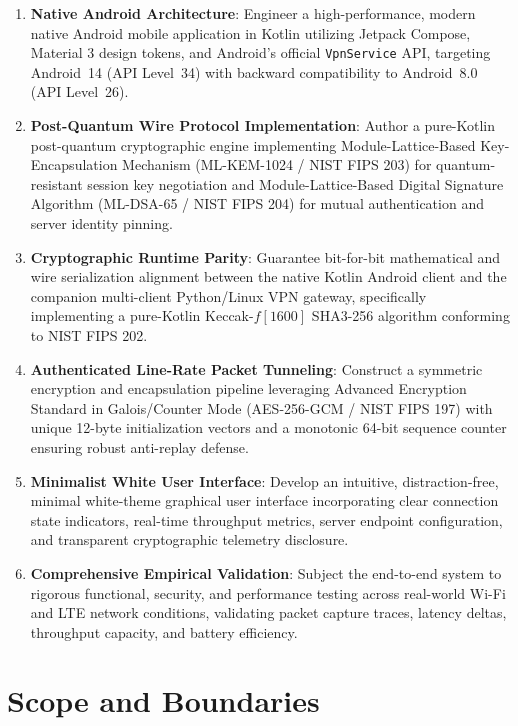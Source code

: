 \begin{enumerate}[label=\textbf{OBJ\arabic*.}]
    \item \textbf{Native Android Architecture}: Engineer a high-performance, modern native Android mobile application in Kotlin utilizing Jetpack Compose, Material 3 design tokens, and Android's official \texttt{VpnService} API, targeting Android~14 (API Level~34) with backward compatibility to Android~8.0 (API Level~26).
    \item \textbf{Post-Quantum Wire Protocol Implementation}: Author a pure-Kotlin post-quantum cryptographic engine implementing Module-Lattice-Based Key-Encapsulation Mechanism (ML-KEM-1024 / NIST FIPS 203) for quantum-resistant session key negotiation and Module-Lattice-Based Digital Signature Algorithm (ML-DSA-65 / NIST FIPS 204) for mutual authentication and server identity pinning.
    \item \textbf{Cryptographic Runtime Parity}: Guarantee bit-for-bit mathematical and wire serialization alignment between the native Kotlin Android client and the companion multi-client Python/Linux VPN gateway, specifically implementing a pure-Kotlin Keccak-$f[1600]$ SHA3-256 algorithm conforming to NIST FIPS 202.
    \item \textbf{Authenticated Line-Rate Packet Tunneling}: Construct a symmetric encryption and encapsulation pipeline leveraging Advanced Encryption Standard in Galois/Counter Mode (AES-256-GCM / NIST FIPS 197) with unique 12-byte initialization vectors and a monotonic 64-bit sequence counter ensuring robust anti-replay defense.
    \item \textbf{Minimalist White User Interface}: Develop an intuitive, distraction-free, minimal white-theme graphical user interface incorporating clear connection state indicators, real-time throughput metrics, server endpoint configuration, and transparent cryptographic telemetry disclosure.
    \item \textbf{Comprehensive Empirical Validation}: Subject the end-to-end system to rigorous functional, security, and performance testing across real-world Wi-Fi and LTE network conditions, validating packet capture traces, latency deltas, throughput capacity, and battery efficiency.
\end{enumerate}

\section{Scope and Boundaries}
\label{sec:scope_boundaries}

